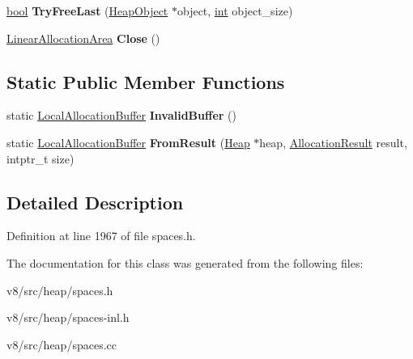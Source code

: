 \begin{DoxyCompactItemize}
\item 
\mbox{\label{classv8_1_1internal_1_1LocalAllocationBuffer_a890deb1657d2cd2c976b0b263712427c}} 
\mbox{\hyperlink{classbool}{bool}} {\bfseries Try\+Free\+Last} (\mbox{\hyperlink{classv8_1_1internal_1_1HeapObject}{Heap\+Object}} $\ast$object, \mbox{\hyperlink{classint}{int}} object\+\_\+size)
\item 
\mbox{\label{classv8_1_1internal_1_1LocalAllocationBuffer_a3c66bbcd1c6f59fe350ac85ba6812198}} 
\mbox{\hyperlink{classv8_1_1internal_1_1LinearAllocationArea}{Linear\+Allocation\+Area}} {\bfseries Close} ()
\end{DoxyCompactItemize}
\subsection*{Static Public Member Functions}
\begin{DoxyCompactItemize}
\item 
\mbox{\label{classv8_1_1internal_1_1LocalAllocationBuffer_a5a9ecd95552ebfd82ef5ab92976c163b}} 
static \mbox{\hyperlink{classv8_1_1internal_1_1LocalAllocationBuffer}{Local\+Allocation\+Buffer}} {\bfseries Invalid\+Buffer} ()
\item 
\mbox{\label{classv8_1_1internal_1_1LocalAllocationBuffer_a2b489f5c4199a70dcf051ebcf76bb4cd}} 
static \mbox{\hyperlink{classv8_1_1internal_1_1LocalAllocationBuffer}{Local\+Allocation\+Buffer}} {\bfseries From\+Result} (\mbox{\hyperlink{classv8_1_1internal_1_1Heap}{Heap}} $\ast$heap, \mbox{\hyperlink{classv8_1_1internal_1_1AllocationResult}{Allocation\+Result}} result, intptr\+\_\+t size)
\end{DoxyCompactItemize}


\subsection{Detailed Description}


Definition at line 1967 of file spaces.\+h.



The documentation for this class was generated from the following files\+:\begin{DoxyCompactItemize}
\item 
v8/src/heap/spaces.\+h\item 
v8/src/heap/spaces-\/inl.\+h\item 
v8/src/heap/spaces.\+cc\end{DoxyCompactItemize}
